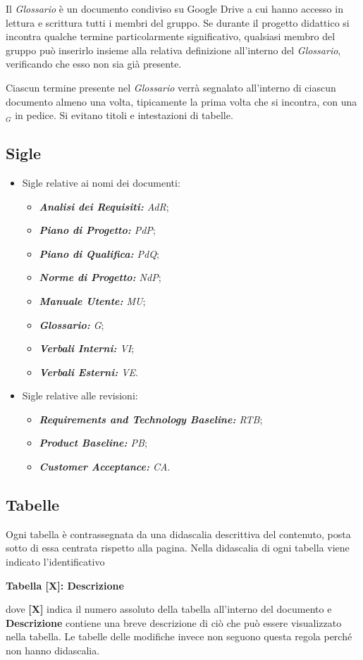 Il \textit{Glossario} è un documento condiviso su Google Drive a cui hanno accesso in lettura e scrittura tutti i membri del gruppo. Se durante il progetto didattico si incontra qualche termine particolarmente significativo, qualsiasi membro del gruppo può inserirlo insieme alla relativa definizione all'interno del \textit{Glossario}, verificando che esso non sia già presente.

Ciascun termine presente nel \textit{Glossario} verrà segnalato all'interno di ciascun documento almeno una volta, tipicamente la prima volta che si incontra, con una $_G$ in pedice. Si evitano titoli e intestazioni di tabelle. 

\subsection{Sigle}\label{sec:Sigle}
\begin{itemize}
    \item Sigle relative ai nomi dei documenti:
    \begin{itemize}
        \item \textit{\textbf{Analisi dei Requisiti:} AdR};
        \item \textit{\textbf{Piano di Progetto:} PdP};
        \item \textit{\textbf{Piano di Qualifica:} PdQ};
        \item \textit{\textbf{Norme di Progetto:} NdP};
        \item \textit{\textbf{Manuale Utente:} MU};
        \item \textit{\textbf{Glossario:} G};
        \item \textit{\textbf{Verbali Interni:} VI};
        \item \textit{\textbf{Verbali Esterni:} VE}.
    \end{itemize}
    \item Sigle relative alle revisioni:
    \begin{itemize}
        \item \textit{\textbf{Requirements and Technology Baseline:} RTB};
        \item \textit{\textbf{Product Baseline:} PB};
        \item \textit{\textbf{Customer Acceptance:} CA}.
    \end{itemize}
\end{itemize}
\subsection{Tabelle}
Ogni tabella è contrassegnata da una didascalia descrittiva del contenuto, posta sotto di essa centrata rispetto alla pagina.  Nella didascalia di ogni tabella viene indicato l’identificativo
\begin{center}
    \textbf{Tabella [X]: Descrizione}
\end{center}
dove \textbf{[X]} indica il numero assoluto della tabella all’interno del documento e \textbf{Descrizione} contiene una breve descrizione di ciò che può essere visualizzato nella tabella. Le tabelle delle modifiche invece non seguono questa regola perché non hanno didascalia.
